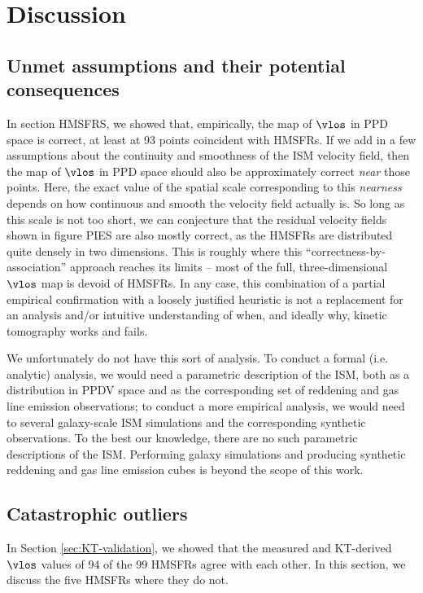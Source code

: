 \section{Discussion}
\label{sec:discussion}

\subsection{Unmet assumptions and their potential consequences}
\label{sec:discussion-systematics}
In section HMSFRS, we showed that, empirically, the map of $\vlos$ in PPD space is correct, at least at 93 points coincident with HMSFRs. 
If we add in a few assumptions about the continuity and smoothness of the ISM velocity field, then the map of $\vlos$ in PPD space should also be approximately correct \emph{near} those points. 
Here, the exact value of the spatial scale corresponding to this \emph{nearness} depends on how continuous and smooth the velocity field actually is.
So long as this scale is not too short, we can conjecture that the residual velocity fields shown in figure PIES are also mostly correct, as the HMSFRs are distributed quite densely in two dimensions. 
This is roughly where this ``correctness-by-association'' approach reaches its limits -- most of the full, three-dimensional $\vlos$ map is devoid of HMSFRs.
In any case, this combination of a partial empirical confirmation with a loosely justified heuristic is not a replacement for an analysis and/or intuitive understanding of when, and ideally why, kinetic tomography works and fails.

We unfortunately do not have this sort of analysis. 
To conduct a formal (i.e. analytic) analysis, we would need a parametric description of the ISM, both as a distribution in PPDV space and as the corresponding set of reddening and gas line emission observations; to conduct a more empirical analysis, we would need to several galaxy-scale ISM simulations and the corresponding synthetic observations. 
To the best our knowledge, there are no such parametric descriptions of the ISM.
Performing galaxy simulations and producing synthetic reddening and gas line emission cubes is beyond the scope of this work.


\subsection{Catastrophic outliers}
\label{sec:discussion-catastrophic}
In Section \ref{sec:KT-validation}, we showed that the measured and KT-derived $\vlos$ values  of 94 of the 99 \Reid HMSFRs agree with each other. 
In this section, we discuss the five HMSFRs where they do not.

